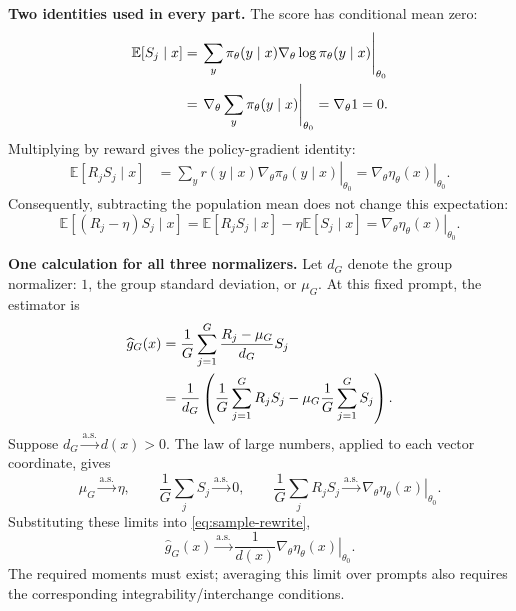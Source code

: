 \documentclass[11pt,a4paper]{article}
\newcommand{\E}{\mathbb{E}}
\newcommand{\as}{\xrightarrow{\mathrm{a.s.}}}
\begin{document}
\textbf{Two identities used in every part.} The score has conditional mean zero:
\begin{align}
  \E[S_j\mid x]
  &=\left.\sum_y \pi_\theta(y\mid x)
                  \nabla_\theta\log\pi_\theta(y\mid x)\right|_{\theta_0} \notag\\
  &=\left.\nabla_\theta\sum_y\pi_\theta(y\mid x)\right|_{\theta_0}
   =\nabla_\theta 1=0. \label{eq:score-zero}
\end{align}
Multiplying by reward gives the policy-gradient identity:
\begin{align}
  \E[R_jS_j\mid x]
  &=\left.\sum_y r(y\mid x)\nabla_\theta\pi_\theta(y\mid x)\right|_{\theta_0}
   =\left.\nabla_\theta\eta_\theta(x)\right|_{\theta_0}.
   \label{eq:reward-score}
\end{align}
Consequently, subtracting the population mean does not change this expectation:
\begin{equation}
  \E[(R_j-\eta)S_j\mid x]
  =\E[R_jS_j\mid x]-\eta\E[S_j\mid x]
  =\left.\nabla_\theta\eta_\theta(x)\right|_{\theta_0}.
  \label{eq:baseline}
\end{equation}

\newpage

\textbf{One calculation for all three normalizers.}
Let $d_G$ denote the group normalizer: $1$, the group standard deviation, or
$\mu_G$. At this fixed prompt, the estimator is
\begin{align}
  \widehat g_G(x)
  &=\frac{1}{G}\sum_{j=1}^{G}\frac{R_j-\mu_G}{d_G}S_j \notag\\
  &=\frac{1}{d_G}
    \left(\frac{1}{G}\sum_{j=1}^{G}R_jS_j
          -\mu_G\frac{1}{G}\sum_{j=1}^{G}S_j\right).
    \label{eq:sample-rewrite}
\end{align}
Suppose $d_G\as d(x)>0$. The law of large numbers, applied to each vector
coordinate, gives
\begin{equation}
  \mu_G\as\eta,\qquad
  \frac{1}{G}\sum_j S_j\as 0,\qquad
  \frac{1}{G}\sum_j R_jS_j
    \as\left.\nabla_\theta\eta_\theta(x)\right|_{\theta_0}.
\end{equation}
Substituting these limits into \eqref{eq:sample-rewrite},
\begin{equation}
  \boxed{\displaystyle
  \widehat g_G(x)\as
    \frac{1}{d(x)}
    \left.\nabla_\theta\eta_\theta(x)\right|_{\theta_0}.}
  \label{eq:master}
\end{equation}
The required moments must exist; averaging this limit over prompts also
requires the corresponding integrability/interchange conditions.
\end{document}
